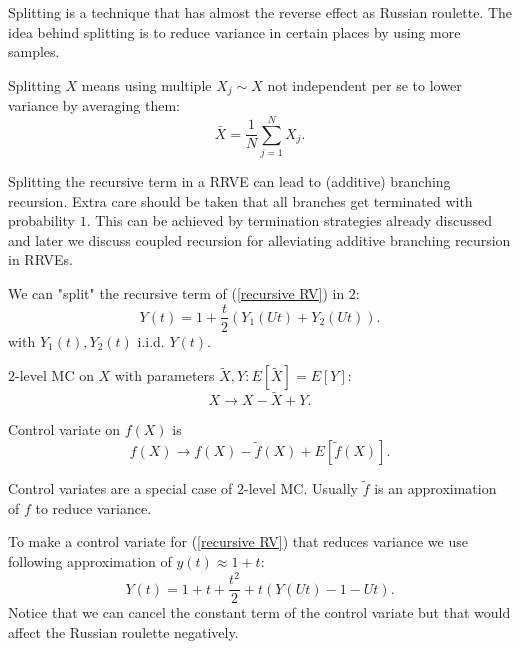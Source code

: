 \documentclass[a4paper,12pt]{article}
\begin{document}
\begin{pythonn}
\end{pythonn}

Splitting is a technique that has almost the reverse effect as Russian roulette.
The idea behind splitting is to reduce variance in certain places by using more
samples.

\begin{definition}[splitting]
    Splitting $X$ means using multiple $X_{j} \sim X$ not independent per se to
    lower variance by averaging them:
    \[
        \bar{X}= \frac{1}{N} \sum_{j=1}^{N} X_{j}
        .\]
\end{definition}

Splitting the recursive term in a RRVE can lead to (additive) branching recursion.
Extra care should be taken that all branches get terminated with probability $1$. This can be
achieved by termination strategies already discussed and later we discuss coupled recursion for
alleviating additive branching recursion in RRVEs.

\begin{example}
    We can "split" the recursive term of  (\ref{recursive RV}) in $2$:
    \[
        Y(t) = 1 + \frac{t}{2}(Y_{1}(Ut)+Y_{2}(Ut))
        .\]
    with $Y_{1}(t),Y_{2}(t)$ i.i.d. $Y(t)$.
\end{example}

\vspace{0.2cm}

\begin{pythonn}
\end{pythonn}

\begin{definition}[$2$-level MC] \label{2 level}
    $2$-level MC on $X$ with parameters $\tilde{X}, Y: E[\tilde{X}]=E[Y]$:
    \[
        X \rightarrow X-\tilde{X} + Y
        .\]
\end{definition}

\begin{definition} \label{CV}
    Control variate on $f(X)$ is
    \[
        f(X) \rightarrow f(X)-\tilde{f}(X) + E[\tilde{f}(X)]
        .\]
\end{definition}
Control variates are a special case of $2$-level MC. Usually $\tilde{f}$ is an approximation
of $f$ to reduce variance.

\begin{example}
    To make a control variate for (\ref{recursive RV}) that reduces variance
    we use following approximation of $y(t) \approx 1+t$:
    \[
        Y(t)= 1+t+\frac{t^{2}}{2} + t(Y(Ut)-1-Ut)
        .\]
    Notice that we can cancel the constant term of the control variate
    but that would affect the Russian roulette negatively.
\end{example}
\end{document}
